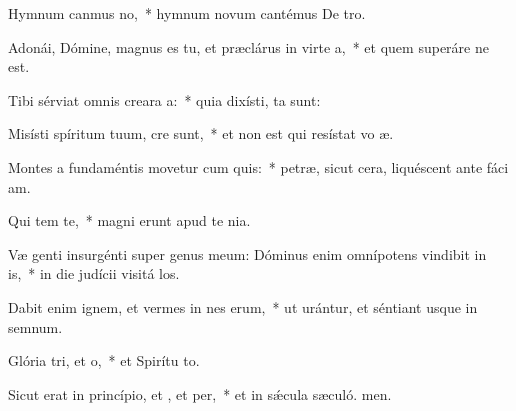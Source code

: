 \item Hymnum canmus no,~* hymnum novum cantémus De tro.
\item Adonái, Dómine, magnus es tu, et præclárus in virte a,~* et quem superáre ne est.
\item Tibi sérviat omnis creara a:~* quia dixísti,  ta sunt:
\item Misísti spíritum tuum,  cre sunt,~* et non est qui resístat vo æ.
\item Montes a fundaméntis movetur cum quis:~* petræ, sicut cera, liquéscent ante fáci am.
\item Qui tem  te,~* magni erunt apud te  nia.
\item Væ genti insurgénti super genus meum: Dóminus enim omnípotens vindibit in is,~* in die judícii visitá los.
\item Dabit enim ignem, et vermes in nes erum,~* ut urántur, et séntiant usque in semnum.
\item Glória tri, et o,~* et Spirítu to.
\item Sicut erat in princípio, et , et per,~* et in sǽcula sæculó. men.
